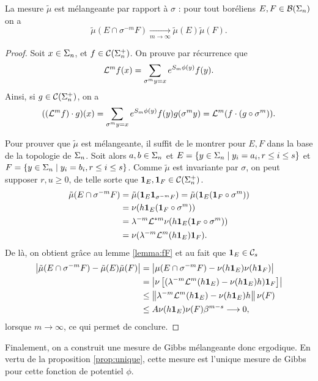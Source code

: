   \begin{proposition}
    \label{prop:mu_mixing}
    La mesure $\tilde\mu$ est mélangeante par rapport à $\sigma$ : pour tout boréliens $E, F \in \mathcal B(\Sigma_n)$ on a
    $$\tilde\mu(E \cap \sigma^{-m} F) \underset{m\to\infty}{\longrightarrow} \tilde\mu(E)\tilde\mu(F).$$
  \end{proposition}

  \begin{proof}
    Soit $x \in \Sigma_n$, et $f \in \mathcal{C} (\Sigma_{n}^+)$. On prouve par récurrence que
    $$\mathcal{L}^mf(x) = \sum_{\sigma^my=x}{e^{S_m\phi(y)}f(y)}.$$
    Ainsi, si $g \in \mathcal{C} (\Sigma_{n}^+)$, on a
    $$((\mathcal{L}^mf)\cdot g)(x) = \sum_{\sigma^my = x}{e^{S_m\phi(y)}f(y)g(\sigma^my)} = \mathcal{L}^m(f\cdot(g\circ\sigma^m)).$$

    Pour prouver que $\tilde\mu$ est mélangeante, il suffit de le montrer pour $E, F$ dans la base de la topologie de $\Sigma_n$.
    Soit alors $a, b \in \Sigma_n$ et $E = \{y \in \Sigma_n \mid y_i = a_i, r \leq i \leq s \}$ et $F = \{y \in \Sigma_n \mid y_i = b_i, r \leq i \leq s \}$.
    Comme $\tilde\mu$ est invariante par $\sigma$, on peut supposer $r, u \geq 0$, de telle sorte que $\mathbf{1}_{E}, \mathbf{1}_{F} \in \mathcal{C} (\Sigma_{n}^+)$.
    \begin{align*}
      \tilde\mu(E\cap\sigma^{-m}F) &= \tilde\mu(\mathbf{1}_{E}\mathbf{1}_{\sigma^{-m}F}) = \tilde\mu(\mathbf{1}_{E}(\mathbf{1}_{F}\circ\sigma^m)) \\
				   &= \nu(h\mathbf{1}_{E}(\mathbf{1}_{F}\circ\sigma^m)) \\
				   &= \lambda^{-m}\mathcal{L}^{*m}\nu(h\mathbf{1}_{E}(\mathbf{1}_{F}\circ\sigma^m)) \\
				   &= \nu(\lambda^{-m}\mathcal{L}^m(h\mathbf{1}_{E})\mathbf{1}_{F}).
    \end{align*}
    De là, on obtient grâce au lemme \ref{lemma:fF} et au fait que $\mathbf{1}_{E} \in \mathcal C_{s}$
    \begin{align*}
      \left|\tilde\mu(E\cap\sigma^{-m}F)-\tilde\mu(E)\tilde\mu(F)\right| &= \left|\mu(E\cap\sigma^{-m}F) - \nu(h\mathbf{1}_{E})\nu(h\mathbf{1}_{F})\right| \\
									 &= \left|\nu\left[(\lambda^{-m}\mathcal{L}^m(h\mathbf{1}_{E})-\nu(h\mathbf{1}_{E})h)\mathbf{1}_{F}\right]\right| \\
									 &\leq \left\lVert \lambda^{-m}\mathcal{L}^m(h\mathbf{1}_{E}) - \nu(h\mathbf{1}_{E})h\right\rVert\nu(F) \\
									 &\leq A\nu(h\mathbf{1}_{E})\nu(F)\beta^{m-s} \longrightarrow 0,
    \end{align*}
    lorsque $m \to \infty$, ce qui permet de conclure.
  \end{proof}

  Finalement, on a construit une mesure de Gibbs mélangeante donc ergodique. En vertu de la proposition \ref{prop:unique},
  cette mesure est l'unique mesure de Gibbs pour cette fonction de potentiel $\phi$.
